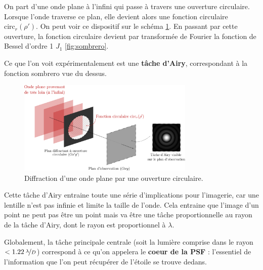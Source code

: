 On part d'une onde plane à l'infini qui passe à travers une ouverture circulaire. Lorsque l'onde traverse ce plan, elle devient alors une fonction circulaire $\text{circ}_r(\rho')$. On peut voir ce dispositif sur le schéma \ref{fig:diff_expl}.
En passant par cette ouverture, la fonction circulaire devient par transformée de Fourier la fonction de Bessel d'ordre 1 $J_1$ \ref{fig:sombrero}.

Ce que l'on voit expérimentalement est une \textbf{tâche d'Airy}, correspondant à la fonction sombrero vue du dessus.

\begin{figure}[htbp]
    \centering
    \includegraphics[width=0.75\textwidth]{figures/diff_expl.png}
    \caption{Diffraction d'une onde plane par une ouverture circulaire.}
    \label{fig:diff_expl}
\end{figure}




Cette tâche d’Airy entraine toute une série d’implications pour l’imagerie, car une lentille n’est pas
infinie et limite la taille de l’onde. Cela entraine que l’image d’un point ne peut pas être un point mais
va être une tâche proportionnelle au rayon de la tâche d’Airy, dont le rayon est proportionnel à $\lambda$. %

Globalement, la tâche principale centrale (soit la lumière comprise dans le rayon $< 1.22\: \nicefrac{\lambda}{D}$) correspond à ce qu'on appelera le \textbf{coeur de la PSF} : l'essentiel de l'information que l'on peut récupérer de l'étoile se trouve dedans.

